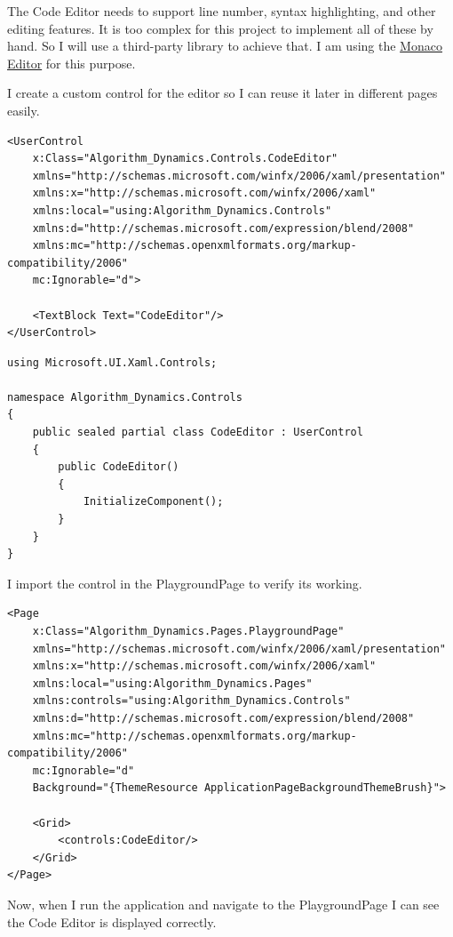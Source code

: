\documentclass[a4paper]{report}
\begin{document}
The Code Editor needs to support line number, syntax highlighting, and other editing features. It is too complex for this project to implement all of these by hand. So I will use a third-party library to achieve that. I am using the \href{https://microsoft.github.io/monaco-editor/}{Monaco Editor} for this purpose.

I create a custom control for the editor so I can reuse it later in different pages easily.

\begin{verbatim}
<UserControl
    x:Class="Algorithm_Dynamics.Controls.CodeEditor"
    xmlns="http://schemas.microsoft.com/winfx/2006/xaml/presentation"
    xmlns:x="http://schemas.microsoft.com/winfx/2006/xaml"
    xmlns:local="using:Algorithm_Dynamics.Controls"
    xmlns:d="http://schemas.microsoft.com/expression/blend/2008"
    xmlns:mc="http://schemas.openxmlformats.org/markup-compatibility/2006"
    mc:Ignorable="d">

    <TextBlock Text="CodeEditor"/>
</UserControl>
\end{verbatim}

\begin{verbatim}
using Microsoft.UI.Xaml.Controls;

namespace Algorithm_Dynamics.Controls
{
    public sealed partial class CodeEditor : UserControl
    {
        public CodeEditor()
        {
            InitializeComponent();
        }
    }
}
\end{verbatim}

I import the control in the PlaygroundPage to verify its working.

\begin{verbatim}
<Page
    x:Class="Algorithm_Dynamics.Pages.PlaygroundPage"
    xmlns="http://schemas.microsoft.com/winfx/2006/xaml/presentation"
    xmlns:x="http://schemas.microsoft.com/winfx/2006/xaml"
    xmlns:local="using:Algorithm_Dynamics.Pages"
    xmlns:controls="using:Algorithm_Dynamics.Controls"
    xmlns:d="http://schemas.microsoft.com/expression/blend/2008"
    xmlns:mc="http://schemas.openxmlformats.org/markup-compatibility/2006"
    mc:Ignorable="d"
    Background="{ThemeResource ApplicationPageBackgroundThemeBrush}">

    <Grid>
        <controls:CodeEditor/>
    </Grid>
</Page>
\end{verbatim}

Now, when I run the application and navigate to the PlaygroundPage I can see the Code Editor is displayed correctly.
\end{document}
